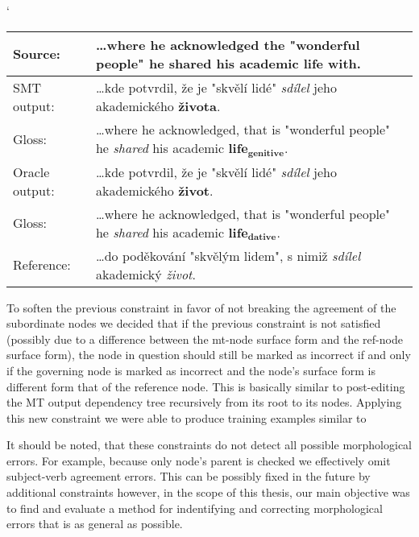 \begin{myexample}
    \small
    \catcode`
    \begin{center}
    \begin{tabular}{|l|p{}|}
    \hline
    \textbf{Source:}  &  \textbf{…where he acknowledged the "wonderful people" he shared his academic life with.}  \\
    \hline
    SMT output:  &  …kde potvrdil, že je "skvělí lidé" \textit{sdílel} jeho akademického \textbf{života}.  \\
    \hline
    Gloss:  &  …where he acknowledged, that is "wonderful people" he \textit{shared} his academic $\mathbf{life_{genitive}}$.  \\
    \hline
    Oracle output:  &  …kde potvrdil, že je "skvělí lidé" \textit{sdílel} jeho akademického \textbf{život}.  \\
    \hline
    Gloss:  &  …where he acknowledged, that is "wonderful people" he \textit{shared} his academic $\mathbf{life_{dative}}$.  \\
    \hline
    Reference:  &  …do poděkování "skvělým lidem", s nimiž \textit{sdílel} akademický \textit{život}.  \\
    \hline
    \end{tabular}
    \label{ex-oracle-parentref}
    \end{center}
\end{myexample}

To soften the previous constraint in favor of not breaking the agreement of the subordinate nodes we decided
that if the previous constraint is not satisfied (possibly due to a difference between the mt-node surface form
and the ref-node surface form), the node in question should still be marked as incorrect if and only if
the governing node is marked as incorrect and the node's surface form is different form that of the reference
node. This is basically similar to post-editing the MT output dependency tree recursively from its
root to its nodes. Applying this new constraint we were able to produce training examples similar to %

It should be noted, that these constraints do not detect all possible morphological errors. For example,
because only node's parent is checked we effectively omit subject-verb agreement errors. This can be possibly
fixed in the future by additional constraints however, in the scope of this thesis, our main objective was
to find and evaluate a method for indentifying and correcting morphological errors that is as general as possible.

